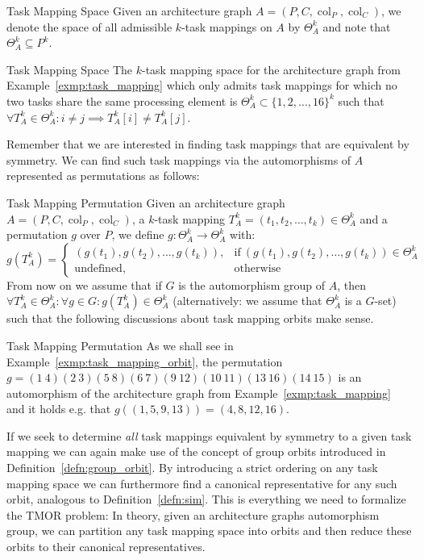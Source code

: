 \begin{defn}{Task Mapping Space}
  Given an architecture graph $A = (P,C, \operatorname{col}_P,
  \operatorname{col}_C)$, we denote the space of all admissible $k$-task mappings
  on $A$ by $\Theta_A^k$ and note that $\Theta_A^k \subseteq P^k$.
\end{defn}

\begin{exmp}[label=exmp:task_mapping_space]{Task Mapping Space}
  The $k$-task mapping space for the architecture graph from
  Example~\ref{exmp:task_mapping} which only admits task mappings for which no
  two tasks share the same processing element is $\Theta_A^k \subset
  \{1,2,\dots,16\}^k$ such that $\forall T_A^k \in \Theta_A^k: i \neq j \implies
  T_{A}^k[i] \neq T_{A}^k[j]$.
\end{exmp}
%
Remember that we are interested in finding task mappings that are equivalent by
symmetry. We can find such task mappings via the automorphisms of $A$
represented as permutations as follows:

\begin{defn}{Task Mapping Permutation}
  Given an architecture graph $A = (P,C, \operatorname{col}_P,
  \operatorname{col}_C)$, a $k$-task mapping $T_A^k = (t_1, t_2, \dots, t_k) \in
  \Theta_A^k$ and a permutation $g$ over $P$, we define $g: \Theta_A^k \to
  \Theta_A^k$ with:
  \begin{equation*}
     g(T_A^k) = \begin{cases}
                   (g(t_1), g(t_2), \dots, g(t_k)),
                     &\text{if}\ (g(t_1), g(t_2), \dots, g(t_k)) \in \Theta_A^k \\
                   \text{undefined},
                     &\text{otherwise}
                 \end{cases}
  \end{equation*}
  From now on we assume that if $G$ is the automorphism group of $A$, then
  $\forall T_A^k \in \Theta_A^k: \forall g \in G: g(T_A^k) \in \Theta_A^k$
  (alternatively: we assume that $\Theta_A^k$ is a $G$-set) such that the
  following discussions about task mapping orbits make sense.
\end{defn}

\begin{exmp}{Task Mapping Permutation}
  As we shall see in Example~\ref{exmp:task_mapping_orbit}, the permutation $g
  = (1\ 4)(2\ 3) (5\ 8)(6\ 7)(9\ 12)(10\ 11)(13\ 16)(14\ 15)$ is an automorphism
  of the architecture graph from Example~\ref{exmp:task_mapping} and it holds
  e.g. that $g((1,5,9,13)) = (4,8,12,16)$.
\end{exmp}
%
If we seek to determine \textit{all} task mappings equivalent by symmetry to a
given task mapping we can again make use of the concept of group orbits
introduced in Definition~\ref{defn:group_orbit}. By introducing a strict
ordering on any task mapping space we can furthermore find a canonical
representative for any such orbit, analogous to Definition~\ref{defn:sim}. This
is everything we need to formalize the TMOR problem: In theory, given an
architecture graphs automorphism group, we can partition any task mapping space
into orbits and then reduce these orbits to their canonical representatives.

